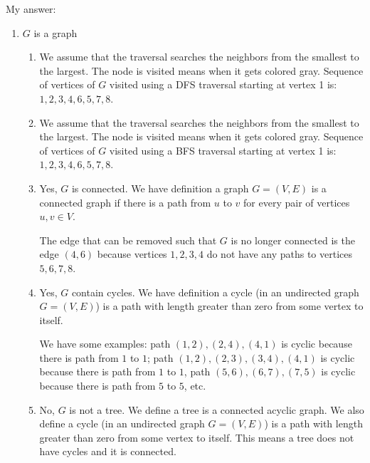 \documentclass{cpsc413Solutions}
\begin{document}


\begin{problemlist}
\begin{problem}
\begin{answer}
My answer:
\newline
\begin{enumerate}
    \item $G$ is a graph 
    
    \begin{enumerate}
        \item We assume that the traversal searches the neighbors from the smallest to the largest. The node is visited means when it gets colored gray. Sequence of vertices of $G$ visited using a DFS traversal starting at vertex 1 is:
        $1,2,3,4,6,5,7,8$. \\
        
        \item We assume that the traversal searches the neighbors from the smallest to the largest. The node is visited means when it gets colored gray. Sequence of vertices of $G$ visited using a BFS traversal starting at vertex 1 is:
        $1,2,3,4,6,5,7,8$.\\
        
        \item Yes, $G$ is connected. We have definition a graph $G=(V,E)$ is a connected graph if there is a path from $u$ to $v$ for every pair of vertices $u,v \in V$.
        
        The edge that can be removed such that $G$ is no longer connected is the edge $(4,6)$ because vertices $1,2,3,4$ do not have any paths to vertices $5,6,7,8$.\\
        
        \item Yes, $G$ contain cycles. We have definition a cycle (in an undirected graph $G= (V,E)$) is a path with length greater than zero from some vertex to itself.
        
        We have some examples: path $(1,2),(2,4),(4,1)$ is cyclic because there is path from $1$ to $1$; path $(1,2),(2,3),(3,4),(4,1)$ is cyclic because there is path from $1$ to $1$, path $(5,6),(6,7),(7,5)$ is cyclic because there is path from $5$ to $5$, etc.
        
        \item No, $G$ is not a tree. We define a tree is a connected acyclic graph. We also define a cycle (in an undirected graph $G= (V,E)$) is a path with length greater than zero from some vertex to itself. This means a tree does not have cycles and it is connected. 
        

\end{enumerate}
\end{enumerate}
\end{answer}
\end{problem}
\end{problemlist}
\end{document}
